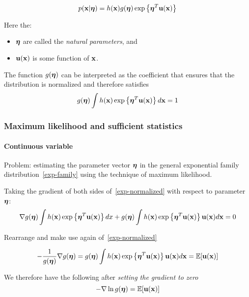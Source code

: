 \begin{equation}
    p(\mathbf{x}|\boldsymbol\eta) = h(\mathbf{x}) g(\boldsymbol\eta) \exp\left\{ \boldsymbol\eta^T \mathbf{u}(\mathbf{x})
\right\}
\label{exp-family}
\end{equation}

Here the:

\begin{itemize}
    \item $\boldsymbol\eta$ are called the \emph{natural parameters}, and 
    \item $\mathbf{u}(\mathbf{x})$ is some function of $\mathbf{x}$. 
\end{itemize}


The function $g(\boldsymbol\eta)$ can be interpreted as the coefficient that
ensures that the distribution is normalized and therefore satisfies
\begin{equation} 
    g(\boldsymbol\eta) \int h(\mathbf{x}) \exp\left\{ \boldsymbol\eta^T \mathbf{u}(\mathbf{x}) \right\}d\mathbf{x}
= 1
\label{exp-normalized}
\end{equation}

\subsubsection{Maximum likelihood and sufficient statistics}
\paragraph{Continuous variable}
Problem: estimating the parameter vector $\boldsymbol\eta$ in the general
exponential family distribution~\ref{exp-family} using the technique of
maximum likelihood.

Taking the gradient of both sides of~\ref{exp-normalized} with respect to
parameter $\boldsymbol\eta$:
\begin{equation}
    \nabla g(\boldsymbol\eta) \int h(\mathbf{x}) \exp\left\{ \boldsymbol\eta^T \mathbf{u}(\mathbf{x}) \right\} dx
    + g(\boldsymbol\eta) \int h(\mathbf{x}) \exp\left\{ \boldsymbol\eta^T \mathbf{u}(\mathbf{x}) \right\}\mathbf{u}(\mathbf{x})
    d\mathbf{x} = 0
\end{equation}

Rearrange and make use again of~\ref{exp-normalized}

\begin{equation}
    -\frac{1}{g(\boldsymbol\eta)} \nabla g(\boldsymbol\eta) = g(\boldsymbol\eta)\int h(\mathbf{x}) \exp\left\{
    \boldsymbol\eta^T \mathbf{u}(\mathbf{x}) \right\}\mathbf{u}(\mathbf{x})d\mathbf{x} = \mathbb{E}[\mathbf{u}(\mathbf{x})]
\end{equation}

We therefore have the following after \emph{setting the gradient to zero}
\begin{equation}
    -\nabla\ln{g(\boldsymbol\eta)} = \mathbb{E}[\mathbf{u}(\mathbf{x})]
\end{equation}


